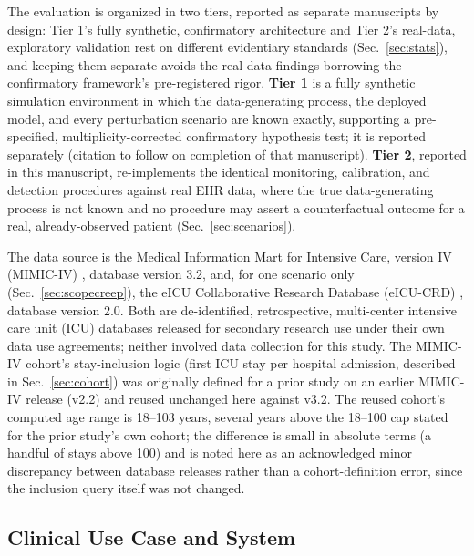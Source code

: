 \documentclass[preprintsapa,article,submit,oneauthor]{Definitions/mdpi}
\begin{document}
The evaluation is organized in two tiers, reported as separate manuscripts by design: Tier 1's fully synthetic, confirmatory architecture and Tier 2's real-data, exploratory validation rest on different evidentiary standards (Sec.~\ref{sec:stats}), and keeping them separate avoids the real-data findings borrowing the confirmatory framework's pre-registered rigor. \textbf{Tier 1} is a fully synthetic simulation environment in which the data-generating process, the deployed model, and every perturbation scenario are known exactly, supporting a pre-specified, multiplicity-corrected confirmatory hypothesis test; it is reported separately (citation to follow on completion of that manuscript). \textbf{Tier 2}, reported in this manuscript, re-implements the identical monitoring, calibration, and detection procedures against real EHR data, where the true data-generating process is not known and no procedure may assert a counterfactual outcome for a real, already-observed patient (Sec.~\ref{sec:scenarios}).

The data source is the Medical Information Mart for Intensive Care, version IV (MIMIC-IV) \citep{johnson2023}, database version 3.2, and, for one scenario only (Sec.~\ref{sec:scopecreep}), the eICU Collaborative Research Database (eICU-CRD) \citep{pollard2018}, database version 2.0. Both are de-identified, retrospective, multi-center intensive care unit (ICU) databases released for secondary research use under their own data use agreements; neither involved data collection for this study. The MIMIC-IV cohort's stay-inclusion logic (first ICU stay per hospital admission, described in Sec.~\ref{sec:cohort}) was originally defined for a prior study on an earlier MIMIC-IV release (v2.2) and reused unchanged here against v3.2. The reused cohort's computed age range is 18--103 years, several years above the 18--100 cap stated for the prior study's own cohort; the difference is small in absolute terms (a handful of stays above 100) and is noted here as an acknowledged minor discrepancy between database releases rather than a cohort-definition error, since the inclusion query itself was not changed.

\subsection{Clinical Use Case and System}
\end{document}
